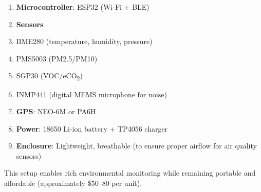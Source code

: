 \documentclass[12pt,a4paper]{article}
\begin{document}
\begin{enumerate}
    \item \textbf{Microcontroller}: ESP32 (Wi-Fi + BLE)

    \item \textbf{Sensors}
    \item BME280 (temperature, humidity, pressure)
    \item PMS5003 (PM2.5/PM10)
    \item SGP30 (VOC/eCO\textsubscript{2})
    \item INMP441 (digital MEMS microphone for noise)

    \item \textbf{GPS}: NEO-6M or PA6H

    \item \textbf{Power}: 18650 Li-ion battery + TP4056 charger

    \item \textbf{Enclosure}: Lightweight, breathable (to ensure proper airflow for air quality sensors)
\end{enumerate}

This setup enables rich environmental monitoring while remaining portable and affordable (approximately \$50–80 per unit).
\end{document}
